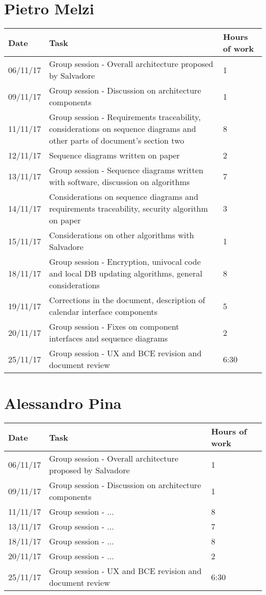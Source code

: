 \section{Pietro Melzi}
\begin{table}[H]
	\begin{tabular}{ p{2cm} p{10cm} p{3cm}}
	Date & Task & Hours of work\\
	\hline
	06/11/17 & Group session - Overall architecture proposed by Salvadore & 1 \\
	09/11/17 & Group session - Discussion on architecture components & 1 \\
	11/11/17 & Group session - Requirements traceability, considerations on sequence diagrams and other parts of document's section two & 8 \\
	12/11/17 & Sequence diagrams written on paper & 2 \\
	13/11/17 & Group session - Sequence diagrams written with software, discussion on algorithms & 7 \\
	14/11/17 & Considerations on sequence diagrams and requirements traceability, security algorithm on paper & 3 \\
	15/11/17 & Considerations on other algorithms with Salvadore & 1 \\
	18/11/17 & Group session - Encryption, univocal code and local DB updating algorithms, general considerations & 8 \\
	19/11/17 & Corrections in the document, description of calendar interface components & 5 \\
	20/11/17 & Group session - Fixes on component interfaces and sequence diagrams & 2 \\
	25/11/17 & Group session - UX and BCE revision and document review & 6:30 \\
	\end{tabular}
\end{table}

\section{Alessandro Pina}
\begin{table}[H]
	\begin{tabular}{ p{2cm} p{10cm} p{3cm}}
	Date & Task & Hours of work\\
	\hline
	06/11/17 & Group session - Overall architecture proposed by Salvadore & 1 \\
	09/11/17 & Group session - Discussion on architecture components & 1 \\
	11/11/17 & Group session - ... & 8 \\
	13/11/17 & Group session - ... & 7 \\
	18/11/17 & Group session - ... & 8 \\
	20/11/17 & Group session - ... & 2 \\
	25/11/17 & Group session - UX and BCE revision and document review & 6:30 \\
	\end{tabular}
\end{table}

